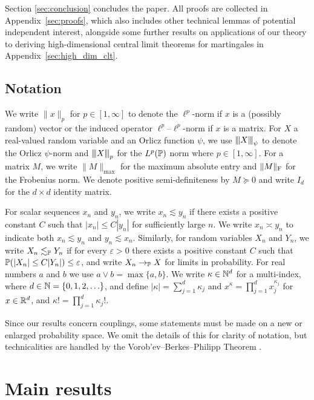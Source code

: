Section \ref{sec:conclusion} concludes the paper. All proofs are collected in
Appendix~\ref{sec:proofs},
which also includes other technical lemmas of
potential independent interest, alongside
some further results on applications of our theory to
deriving high-dimensional central limit theorems for martingales
in Appendix~\ref{sec:high_dim_clt}.

\subsection{Notation}

We write $\|x\|_p$ for $p\in[1,\infty]$ to denote the $\ell^p$-norm if $x$ is a
(possibly random) vector or the induced operator $\ell^p$--$\ell^p$-norm if $x$
is a matrix. For $X$ a real-valued random variable and an Orlicz function
$\psi$, we use $\vvvert X \vvvert_\psi$ to denote the Orlicz $\psi$-norm
\citep[Section~2.2]{van1996weak} and $\vvvert X \vvvert_p$ for the $L^p(\P)$
norm where $p\in [1,\infty]$. For a matrix $M$, we write $\|M\|_{\max}$ for the
maximum absolute entry and $\|M\|_\rF$ for the Frobenius norm. We denote
positive semi-definiteness by $M \succeq 0$ and write $I_d$ for the $d \times
d$ identity matrix.

For scalar sequences $x_n$ and $y_n$, we write $x_n \lesssim y_n$ if there
exists a positive constant $C$ such that $|x_n| \leq C |y_n|$ for sufficiently
large $n$. We write $x_n \asymp y_n$ to indicate both $x_n \lesssim y_n$ and
$y_n \lesssim x_n$. Similarly, for random variables $X_n$ and $Y_n$, we write
$X_n \lesssim_\P Y_n$ if for every $\varepsilon > 0$ there exists a positive
constant $C$ such that $\P(|X_n| \leq C |Y_n|) \leq \varepsilon$, and write
$X_n \to_\P X$ for limits in probability. For real numbers $a$ and $b$ we use
$a \vee b = \max\{a,b\}$. We write $\kappa \in \N^d$ for a multi-index, where
$d \in \N = \{0, 1, 2, \ldots\}$, and define $|\kappa| = \sum_{j=1}^d \kappa_j$
and $x^\kappa = \prod_{j=1}^d x_j^{\kappa_j}$ for $x \in \R^d$,
and $\kappa! = \prod_{j=1}^{d} \kappa_j !$.

Since our results concern couplings, some statements must be made on a new or
enlarged probability space. We omit the details of this for clarity of
notation, but technicalities are handled by the Vorob'ev--Berkes--Philipp
Theorem \citep[Theorem~1.1.10]{dudley1999uniform}.

\section{Main results}
\label{sec:main_results}

